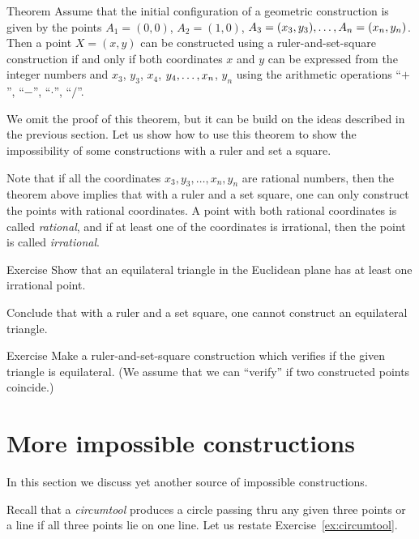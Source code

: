 \begin{thm}{Theorem}
Assume that the initial configuration of a geometric construction is given by the points $A_1=(0,0)$, $A_2=(1,0)$, $A_3=(x_3,y_3),\z\dots,A_n=(x_n,y_n)$.
Then a point $X=(x,y)$ can be constructed using a ruler-and-set-square construction
if and only if both coordinates $x$ and $y$ can be expressed from the integer numbers and $x_3$, $y_3$, $x_4$, $y_4,\z\dots,x_n$, $y_n$ using the arithmetic operations ``$+$'', ``$-$'', ``$\cdot$'', ``$/$''. 
\end{thm}

We omit the proof of this theorem, but it can be build on the ideas described in the previous section. 
Let us show how to use this theorem to show the impossibility of some constructions with a ruler and set a square.

Note that if all the coordinates $x_3,y_3,\dots,x_n,y_n$ are rational numbers, then the theorem above implies that with a ruler and a set square, one can only construct the points with rational coordinates.
A point with both rational coordinates is called \emph{rational},
and if at least one of the coordinates is irrational, then the point is called \emph{irrational}.

\begin{thm}{Exercise}\label{ex:equilateral triangle}
Show that an equilateral triangle in the Euclidean plane has at least one irrational point.

Conclude that with a ruler and a set square, one cannot construct an equilateral triangle.
\end{thm}


\begin{thm}{Exercise}\label{ex:equilateral triangle-verify}
Make a ruler-and-set-square construction which verifies if the given triangle is  equilateral.
(We assume that we can ``verify'' if two constructed points coincide.) 
\end{thm}


\section*{More impossible constructions}

In this section we discuss yet another source of impossible constructions. 

Recall that a \emph{circumtool} produces a circle passing thru any given three points
or a line if all three points lie on one line.
Let us restate Exercise~\ref{ex:circumtool}.

